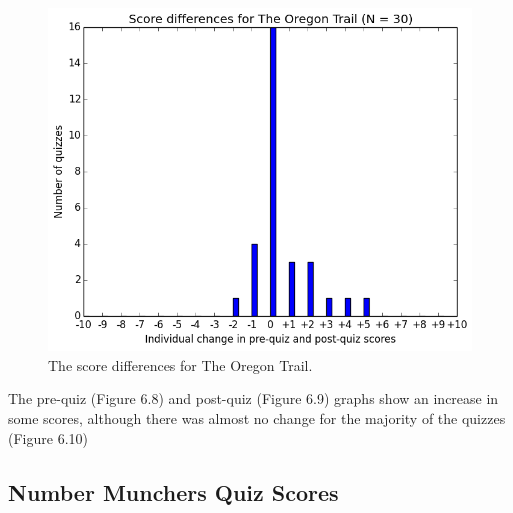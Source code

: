 			\begin{figure}[] 
			\centering 
			\includegraphics[width=\textwidth]{oregon_results.png} 
			\caption{The score differences for The Oregon Trail.}
			\end{figure}

			The pre-quiz (Figure 6.8) and post-quiz (Figure 6.9) graphs show an increase in some scores, although there was almost no change for the majority of the quizzes (Figure 6.10)

			\clearpage

		\subsection{Number Munchers Quiz Scores}

